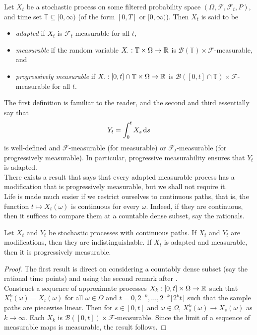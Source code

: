 \begin{definition}
	Let $X_t$ be a stochastic process on some filtered probability space $(\Omega,\mathcal{F},\mathcal{F}_t,P)$, and time set $\mathbb{T}\subseteq[0,\infty)$ (of the form $[0,T]$ or $[0,\infty)$). Then $X_t$ is said to be 
	\begin{itemize}
		\item \textit{adapted} if $X_t$ is $\mathcal{F}_t$-measurable for all $t$,
		\item \textit{measurable} if the random variable $X_{\cdot}:\mathbb{T}\times\Omega\to\mathbb{R}$ is $\mathcal{B}(\mathbb{T})\times\mathcal{F}$-measurable, and
		\item \textit{progressively measurable} if $X_{\cdot}:[0,t]\cap\mathbb{T}\times\Omega\to\mathbb{R}$ is $\mathcal{B}([0,t]\cap\mathbb{T})\times\mathcal{F}$-measurable for all $t$.
	\end{itemize}
\end{definition}

The first definition is familiar to the reader, and the second and third essentially say that
\[ Y_t = \int_0^t X_s\operatorname{d}\!{s} \]
is well-defined and $\mathcal{F}$-measurable (for measurable) or $\mathcal{F}_t$-measurable (for progressively measurable). In particular, progressive measurability ensures that $Y_t$ is adapted.\\
There exists a result that says that every adapted measurable process has a modification that is progressively measurable, but we shall not require it.\\

Life is made much easier if we restrict ourselves to continuous paths, that is, the function $t\mapsto X_t(\omega)$ is continuous for every $\omega$. Indeed, if they are continuous, then it suffices to compare them at a countable dense subset, say the rationals.

\begin{lemma}
	Let $X_t$ and $Y_t$ be stochastic processes with continuous paths. If $X_t$ and $Y_t$ are modifications, then they are indistinguishable. If $X_t$ is adapted and measurable, then it is progressively measurable.
\end{lemma}
\begin{proof}
	The first result is direct on considering a countably dense subset (say the rational time points) and using the second remark after .\\
	Construct a sequence of approximate processes $X_k : [0,t]\times\Omega\to\mathbb{R}$ such that $X_t^k(\omega)=X_t(\omega)$ for all $\omega\in\Omega$ and $t=0,2^{-k},\ldots,2^{-k}\lfloor 2^k t\rfloor$ such that the sample paths are piecewise linear. Then for $s\in[0,t]$ and $\omega\in\Omega$, $X_s^k(\omega)\to X_s(\omega)$ as $k\to\infty$. Each $X_k$ is $\mathcal{B}([0,t])\times\mathcal{F}$-measurable. Since the limit of a sequence of measurable maps is measurable, the result follows.
\end{proof}

